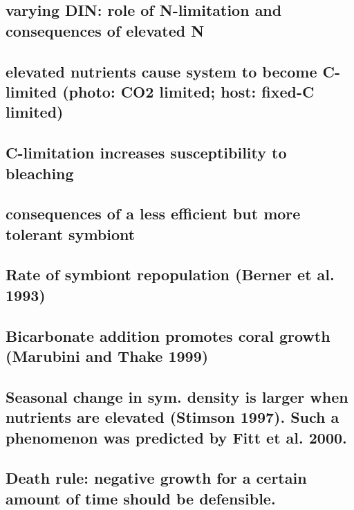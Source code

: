 \documentclass[]{elsarticle} %
\begin{document}
\subsection{varying DIN: role of N-limitation and consequences of
elevated
N}\label{varying-din-role-of-n-limitation-and-consequences-of-elevated-n}

\subsection{elevated nutrients cause system to become C-limited (photo:
CO2 limited; host: fixed-C
limited)}\label{elevated-nutrients-cause-system-to-become-c-limited-photo-co2-limited-host-fixed-c-limited}

\subsection{C-limitation increases susceptibility to
bleaching}\label{c-limitation-increases-susceptibility-to-bleaching}

\subsection{consequences of a less efficient but more tolerant
symbiont}\label{consequences-of-a-less-efficient-but-more-tolerant-symbiont}

\subsection{Rate of symbiont repopulation (Berner et al.
1993)}\label{rate-of-symbiont-repopulation-berner-et-al.-1993}

\subsection{Bicarbonate addition promotes coral growth (Marubini and
Thake
1999)}\label{bicarbonate-addition-promotes-coral-growth-marubini-and-thake-1999}

\subsection{Seasonal change in sym. density is larger when nutrients are
elevated (Stimson 1997). Such a phenomenon was predicted by Fitt et al.
2000.}\label{seasonal-change-in-sym.-density-is-larger-when-nutrients-are-elevated-stimson-1997.-such-a-phenomenon-was-predicted-by-fitt-et-al.-2000.}

\subsection{Death rule: negative growth for a certain amount of time
should be
defensible.}\label{death-rule-negative-growth-for-a-certain-amount-of-time-should-be-defensible.}
\end{document}
